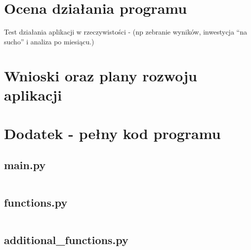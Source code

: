 \documentclass[magister]{dyplom}
\begin{document}
\chapter{Ocena działania programu}

Test działania 
aplikacji w rzeczywistości - (np zebranie wyników, inwestycja “na sucho” i analiza po miesiącu.)


\chapter{Wnioski oraz plany rozwoju aplikacji}

\appendixpage
\appendix

\chapter{Dodatek - pełny kod programu}\label{Dod1}

\section{main.py}
\inputminted[breaklines]{python}{the-wallet/main.py}

\section{functions.py}
\inputminted[breaklines]{python}{the-wallet/functions.py}

\section{additional\_functions.py}
\inputminted[breaklines]{python}{the-wallet/additional_functions.py}


\end{document}
